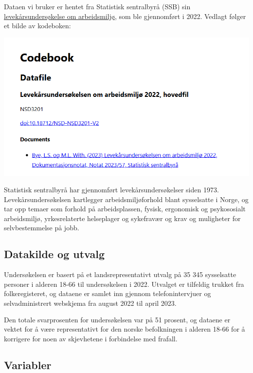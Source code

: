 \documentclass[
  12pt,
  a4paper,
  DIV=11,
  numbers=noendperiod]{scrartcl}
\begin{document}
Dataen vi bruker er hentet fra Statistisk sentralbyrå (SSB) sin
\href{https://www.ssb.no/arbeid-og-lonn/arbeidsmiljo-sykefravaer-og-arbeidskonflikter/artikler/levekarsundersokelsen-om-arbeidsmiljo-2022}{levekårsundersøkelse
om arbeidsmiljø}, som ble gjennomført i 2022. Vedlagt følger et bilde av
kodeboken:

\includegraphics{dokumentobjekter/bilder/codebook.png}

Statistisk sentralbyrå har gjennomført levekårsundersøkelser siden 1973.
Levekårsundersøkelsen kartlegger arbeidsmiljøforhold blant sysselsatte i
Norge, og tar opp temaer som forhold på arbeidsplassen, fysisk,
ergonomisk og psykososialt arbeidsmiljø, yrkesrelaterte helseplager og
sykefravær og krav og muligheter for selvbestemmelse på jobb.

\subsection{Datakilde og utvalg}\label{datakilde-og-utvalg}

Undersøkelsen er basert på et landsrepresentativt utvalg på 35 345
sysselsatte personer i alderen 18-66 til undersøkelsen i 2022. Utvalget
er tilfeldig trukket fra folkeregisteret, og dataene er samlet inn
gjennom telefonintervjuer og selvadministrert webskjema fra august 2022
til april 2023.

Den totale svarprosenten for undersøkelsen var på 51 prosent, og dataene
er vektet for å være representativt for den norske befolkningen i
alderen 18-66 for å korrigere for noen av skjevhetene i forbindelse med
frafall.

\subsection{Variabler}\label{variabler}
\end{document}
